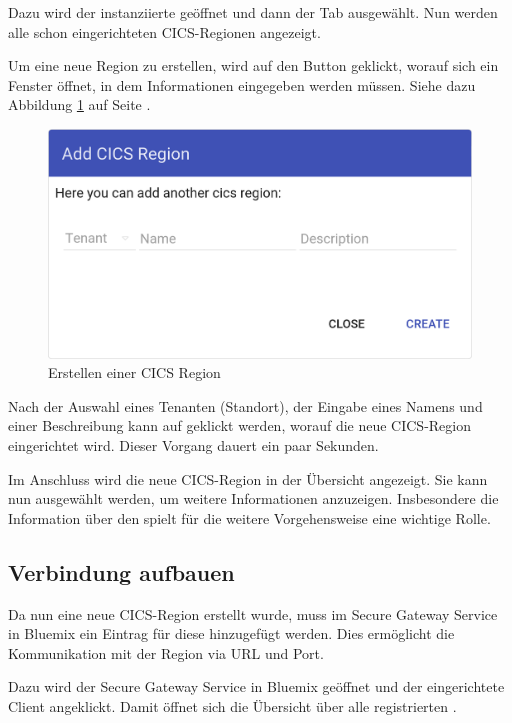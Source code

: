 Dazu wird der instanziierte  geöffnet und dann der Tab  ausgewählt. Nun werden alle
schon eingerichteten CICS-Regionen angezeigt.

Um eine neue Region zu erstellen, wird auf den Button  geklickt, worauf sich ein Fenster öffnet, in dem
Informationen eingegeben werden müssen. Siehe dazu Abbildung \ref{fig:image_cicsErstellen} auf Seite
\pageref{fig:image_cicsErstellen}.

\begin{figure}[h]
  \centering
    \includegraphics[scale=0.2]{images/kapitel_4/image_cicsErstellen.png}
  \caption{Erstellen einer CICS Region}
  \label{fig:image_cicsErstellen}
\end{figure}

Nach der Auswahl eines Tenanten (Standort), der Eingabe eines Namens und einer Beschreibung kann auf  geklickt
werden, worauf die neue CICS-Region eingerichtet wird. Dieser Vorgang dauert ein paar Sekunden.

Im Anschluss wird die neue CICS-Region in der Übersicht angezeigt. Sie kann nun ausgewählt werden, um weitere Informationen
anzuzeigen. Insbesondere die Information über den  spielt für die weitere Vorgehensweise eine wichtige Rolle.

\subsection{Verbindung aufbauen}
Da nun eine neue CICS-Region erstellt wurde, muss im Secure Gateway Service in Bluemix ein Eintrag für diese hinzugefügt
werden. Dies ermöglicht die Kommunikation mit der Region via URL und Port.

Dazu wird der Secure Gateway Service in Bluemix geöffnet und der eingerichtete Client angeklickt. Damit öffnet sich die
Übersicht über alle registrierten .

